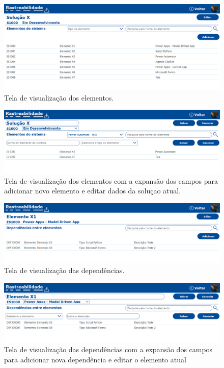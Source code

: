 	\begin{figure}[!htb]
		\centering
		\includegraphics[width=1\textwidth]{./figuras/solucaoElementos.png}
		\caption{Tela de visualização dos elementos.}
		\label{fig:resultados:solucaoElementos}
	\end{figure}

	\begin{figure}[!htb]
		\centering
		\includegraphics[width=1\textwidth]{./figuras/solucaoElementosAdd.png}
		\caption{Tela de visualização dos elementos com a expansão dos campos para adicionar novo elemento e editar dados da soluçao atual.}
		\label{fig:resultados:solucaoElementosAdd}
	\end{figure}

	\begin{figure}[!htb]
		\centering
		\includegraphics[width=1\textwidth]{./figuras/elementoDependencias.png}
		\caption{Tela de visualização das dependências.}
		\label{fig:resultados:elementoDependencias}
	\end{figure}

	\begin{figure}[!htb]
		\centering
		\includegraphics[width=1\textwidth]{./figuras/elementoDependenciasAdd.png}
		\caption{Tela de visualização das dependências com a expansão dos campos para adicionar nova dependência e editar o elemento atual}
		\label{fig:resultados:elementoDependenciasAdd}
	\end{figure}

